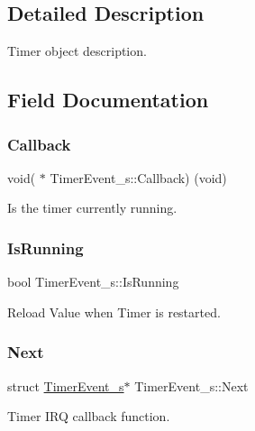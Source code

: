\subsection{Detailed Description}
Timer object description. 

\subsection{Field Documentation}
\mbox{\label{structTimerEvent__s_af9ed72eb732fd7bfc80dc84d289395eb}} 
\subsubsection{\texorpdfstring{Callback}{Callback}}
{\footnotesize\ttfamily void( $\ast$ Timer\+Event\+\_\+s\+::\+Callback) (void)}



Is the timer currently running. 

\mbox{\label{structTimerEvent__s_a6dfdcda52c7bc3e408cb590ccbfdbe60}} 
\subsubsection{\texorpdfstring{Is\+Running}{IsRunning}}
{\footnotesize\ttfamily bool Timer\+Event\+\_\+s\+::\+Is\+Running}



Reload Value when Timer is restarted. 

\mbox{\label{structTimerEvent__s_a7b5d3c09b4a4b03eff360fd818389d0b}} 
\subsubsection{\texorpdfstring{Next}{Next}}
{\footnotesize\ttfamily struct \hyperlink{structTimerEvent__s}{Timer\+Event\+\_\+s}$\ast$ Timer\+Event\+\_\+s\+::\+Next}



Timer I\+RQ callback function. 


